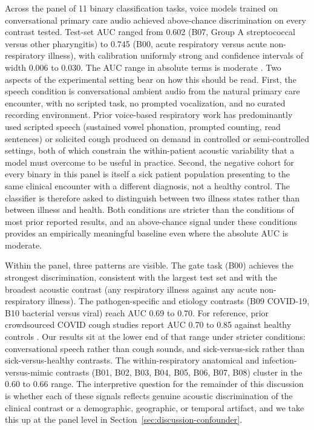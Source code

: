 \documentclass[utf8]{FrontiersinHarvard} %
\begin{document}
Across the panel of 11 binary classification tasks, voice models trained on conversational primary care audio achieved above-chance discrimination on every contrast tested. Test-set AUC ranged from 0.602 (B07, Group A streptococcal versus other pharyngitis) to 0.745 (B00, acute respiratory versus acute non-respiratory illness), with calibration uniformly strong and confidence intervals of width 0.006 to 0.030. The AUC range in absolute terms is moderate \citep{corbacioglu-auc-interpretation-2023}. Two aspects of the experimental setting bear on how this should be read. First, the speech condition is conversational ambient audio from the natural primary care encounter, with no scripted task, no prompted vocalization, and no curated recording environment. Prior voice-based respiratory work has predominantly used scripted speech (sustained vowel phonation, prompted counting, read sentences) or solicited cough produced on demand in controlled or semi-controlled settings, both of which constrain the within-patient acoustic variability that a model must overcome to be useful in practice. Second, the negative cohort for every binary in this panel is itself a sick patient population presenting to the same clinical encounter with a different diagnosis, not a healthy control. The classifier is therefore asked to distinguish between two illness states rather than between illness and health. Both conditions are stricter than the conditions of most prior reported results, and an above-chance signal under these conditions provides an empirically meaningful baseline even where the absolute AUC is moderate.

Within the panel, three patterns are visible. The gate task (B00) achieves the strongest discrimination, consistent with the largest test set and with the broadest acoustic contrast (any respiratory illness against any acute non-respiratory illness). The pathogen-specific and etiology contrasts (B09 COVID-19, B10 bacterial versus viral) reach AUC 0.69 to 0.70. For reference, prior crowdsourced COVID cough studies report AUC 0.70 to 0.85 against healthy controls \citep{covid-19-sounds-xia-2021,dicova-1-2021}. Our results sit at the lower end of that range under stricter conditions: conversational speech rather than cough sounds, and sick-versus-sick rather than sick-versus-healthy contrasts. The within-respiratory anatomical and infection-versus-mimic contrasts (B01, B02, B03, B04, B05, B06, B07, B08) cluster in the 0.60 to 0.66 range. The interpretive question for the remainder of this discussion is whether each of these signals reflects genuine acoustic discrimination of the clinical contrast or a demographic, geographic, or temporal artifact, and we take this up at the panel level in Section~\ref{sec:discussion-confounder}. 
\end{document}
